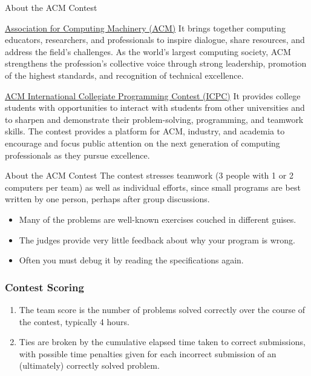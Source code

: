 \documentclass{beamer}
\begin{document}
\begin{frame}{About the ACM Contest}

  \begin{block}{\href{https://www.acm.org/}{Association for Computing Machinery (ACM)}}
    It brings together computing educators, researchers, and professionals to inspire dialogue, share resources, and address the field's challenges. As the world’s largest computing society, ACM strengthens the profession's collective voice through strong leadership, promotion of the highest standards, and recognition of technical excellence.
  \end{block}

  \begin{block}{\href{https://icpc.baylor.edu/}{ACM International Collegiate Programming Contest (ICPC)}}
    It provides college students with opportunities to interact with students from other universities and to sharpen and demonstrate their problem-solving, programming, and teamwork skills.
   The contest provides a platform for ACM, industry, and academia to encourage and focus public attention on the next generation of computing professionals as they pursue excellence.
 \end{block}
\end{frame}


\begin{frame}{About the ACM Contest}
  The contest stresses teamwork (3 people with 1 or 2 computers per team) as well as individual efforts, since small programs are best written by one person, perhaps after group discussions.

  \begin{itemize}
  \item Many of the problems are well-known exercises couched in different guises.
  \item The  judges  provide  very  little  feedback  about  why  your program is wrong.
  \item Often you must debug it by reading the specifications again.
  \end{itemize}

\end{frame}

\begin{frame}
  \frametitle{Contest Scoring}

  \begin{enumerate}
  \item \alert{The team score is the number of problems solved correctly} over the course of the contest, typically 4 hours.
  \item Ties are broken by the cumulative elapsed time taken to correct submissions, with possible time penalties given for each incorrect submission of an (ultimately) correctly solved problem.
  \end{enumerate}

\end{frame}
\end{document}
